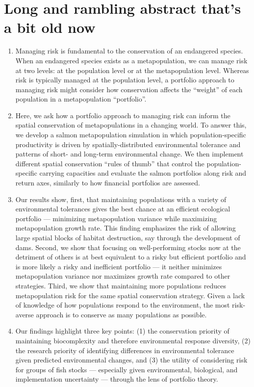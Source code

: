 \section{Long and rambling abstract that's a bit old now}

\begin{enumerate}
\def\labelenumi{\arabic{enumi}.}
\item
  Managing risk is fundamental to the conservation of an endangered species. When an endangered species exists as a metapopulation, we can manage risk at two levels: at the population level or at the metapopulation level. Whereas risk is typically managed at the population level, a portfolio approach to managing risk might consider how conservation affects the ``weight'' of each population in a metapopulation ``portfolio''.
\item
  Here, we ask how a portfolio approach to managing risk can inform the spatial conservation of metapopulations in a changing world. To answer this, we develop a salmon metapopulation simulation in which population-specific productivity is driven by spatially-distributed environmental tolerance and patterns of short- and long-term environmental change. We then implement different spatial conservation ``rules of thumb'' that control the population-specific carrying capacities and evaluate the salmon portfolios along risk and return axes, similarly to how financial portfolios are assessed.
\item
  Our results show, first, that maintaining populations with a variety of environmental tolerances gives the best chance at an efficient ecological portfolio --- minimizing metapopulation variance while maximizing metapopulation growth rate. This finding emphasizes the risk of allowing large spatial blocks of habitat destruction, say through the development of dams. Second, we show that focusing on well-performing stocks now at the detriment of others is at best equivalent to a risky but efficient portfolio and is more likely a risky and inefficient portfolio --- it neither minimizes metapopulation variance nor maximizes growth rate compared to other strategies. Third, we show that maintaining more populations reduces metapopulation risk for the same spatial conservation strategy. Given a lack of knowledge of how populations respond to the environment, the most risk-averse approach is to conserve as many populations as possible.
\item
  Our findings highlight three key points: (1) the conservation priority of maintaining biocomplexity and therefore environmental response diversity, (2) the research priority of identifying differences in environmental tolerance given predicted environmental changes, and (3) the utility of considering risk for groups of fish stocks --- especially given environmental, biological, and implementation uncertainty --- through the lens of portfolio theory.
\end{enumerate}

